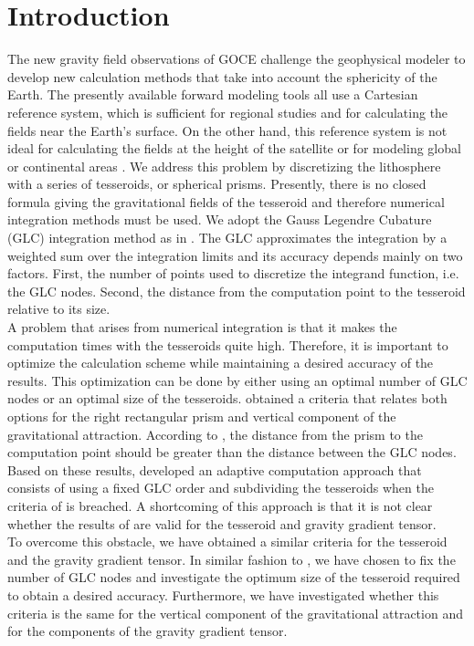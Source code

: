 \documentclass[a4paper,twocolumn]{esapub2005} %
\begin{document}
\section{Introduction}
The new gravity field observations of GOCE challenge the geophysical modeler to develop
new calculation methods that take into account the sphericity of the Earth.
The presently available forward modeling tools all use a Cartesian reference system,
which is sufficient for regional studies and for calculating the fields near the Earth's
surface.
On the other hand, this reference system is not ideal for calculating the fields at the
height of the satellite or for modeling global or continental areas \citep{smith_etal2001}.
We address this problem by discretizing the lithosphere with a series of tesseroids, or
spherical prisms.
Presently, there is no closed formula giving the gravitational fields of the tesseroid
and therefore numerical integration methods must be used.
We adopt the Gauss Legendre Cubature (GLC) integration method as in
\citet{asgharzadeh_etal2007}.
The GLC approximates the integration by a weighted sum over the integration limits and its
accuracy depends mainly on two factors.
First, the number of points used to discretize the integrand function, i.e. the GLC nodes.
Second, the distance from the computation point to the tesseroid relative to its size.
\\[0.2cm]
A problem that arises from numerical integration is that it makes the computation times
with the tesseroids quite high.
Therefore, it is important to optimize the calculation scheme while maintaining a desired
accuracy of the results.
This optimization can be done by either using an optimal number of GLC nodes or an optimal
size of the tesseroids.
\citet{ku1977} obtained a criteria that relates both options for the right rectangular
prism and vertical component of the gravitational attraction.
According to \citet{ku1977}, the distance from the prism to the computation point should
be greater than the distance between the GLC nodes.
Based on these results, \citet{li_etal2011} developed an adaptive computation approach that
consists of using a fixed GLC order and subdividing the tesseroids when the criteria of
\citet{ku1977} is breached.
A shortcoming of this approach is that it is not clear whether the results of \citet{ku1977}
are valid for the tesseroid and gravity gradient tensor.
\\[0.2cm]
To overcome this obstacle, we have obtained a similar criteria for the tesseroid and
the gravity gradient tensor.
In similar fashion to \citet{li_etal2011}, we have chosen to fix the number of GLC nodes
and investigate the optimum size of the tesseroid required to obtain a desired accuracy.
Furthermore, we have investigated whether this criteria is the same for the vertical
component of the gravitational attraction and for the components of the gravity gradient
tensor.
\end{document}
